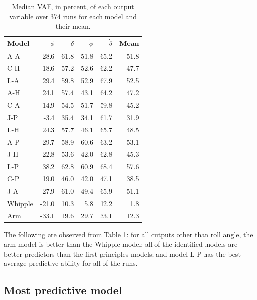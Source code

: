 \documentclass[a4paper]{article}
\begin{document}
\begin{table}
  \centering
  \caption{Median VAF, in percent, of each output variable over 374 runs for
  each model and their mean.}
  \footnotesize
  \begin{tabular}{lrrrrr}
    \toprule
    Model   & $\phi$   & $\delta$ & $\dot{\phi}$ & $\dot{\delta}$ & Mean   \\
    \midrule
    A-A     & 28.6   & 61.8   & 51.8      & 65.2          & 51.8 \\
    C-H     & 18.6   & 57.2   & 52.6      & 62.2          & 47.7 \\
    L-A     & 29.4   & 59.8   & 52.9      & 67.9          & 52.5 \\
    A-H     & 24.1   & 57.4   & 43.1      & 64.2          & 47.2 \\
    C-A     & 14.9   & 54.5   & 51.7      & 59.8          & 45.2 \\
    J-P     & -3.4   & 35.4   & 34.1      & 61.7          & 31.9 \\
    L-H     & 24.3   & 57.7   & 46.1      & 65.7          & 48.5 \\
    A-P     & 29.7   & 58.9   & 60.6      & 63.2          & 53.1 \\
    J-H     & 22.8   & 53.6   & 42.0      & 62.8          & 45.3 \\
    L-P     & 38.2   & 62.8   & 60.9      & 68.4          & 57.6 \\
    C-P     & 19.0   & 46.0   & 42.0      & 47.1          & 38.5 \\
    J-A     & 27.9   & 61.0   & 49.4      & 65.9          & 51.1 \\
    Whipple & -21.0  & 10.3   & 5.8       & 12.2          &  1.8 \\
    Arm     & -33.1  & 19.6   & 29.7      & 33.1          & 12.3 \\
    \bottomrule
  \end{tabular}
  \label{tab:MedianVAFOutputs}
\end{table}

The following are observed from Table \ref{tab:MedianVAFOutputs}: for all
outputs other than roll angle, the arm model is better than the Whipple model;
all of the identified models are better predictors than the first principles
models; and model L-P has the best average predictive ability for all of the
runs.

\subsection*{Most predictive model}
\end{document}
